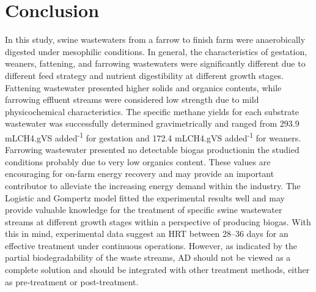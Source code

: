 \section{Conclusion}
In this study, swine wastewaters from a farrow to finish farm were anaerobically digested under mesophilic conditions. In general, the characteristics of gestation, weaners, fattening, and farrowing wastewaters were significantly different due to different feed strategy and nutrient digestibility at different growth stages. Fattening wastewater presented higher solids and organics contents, while farrowing effluent streams were considered low strength due to mild physicochemical characteristics. The specific methane yields for each substrate wastewater was successfully determined gravimetrically and ranged from 293.9 mLCH4.gVS added\textsuperscript{-1} for gestation and 172.4 mLCH4.gVS added\textsuperscript{-1} for weaners. Farrowing wastewater presented no detectable biogas productionin the studied conditions probably due to very low organics content. These values are encouraging for on-farm energy recovery and may provide an important contributor to
alleviate the increasing energy demand within the industry. The Logistic and Gompertz model fitted the experimental results well and may provide valuable knowledge for the treatment of specific swine wastewater streams at different growth stages within a perspective of producing biogas. With this in mind, experimental data suggest an HRT between 28–36 days for an effective treatment under continuous operations. However, as indicated by the partial biodegradability of the waste streams, AD should not be viewed as a complete solution and should be integrated with other treatment methods, either as pre-treatment or post-treatment.